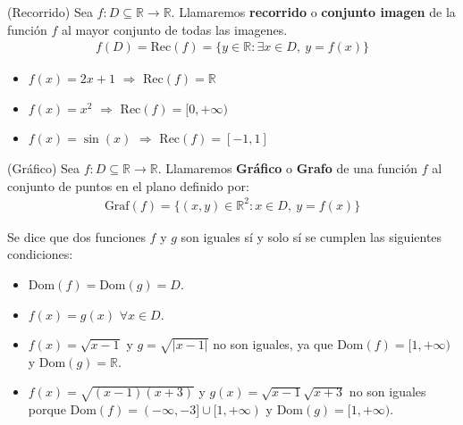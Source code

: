 \documentclass[12pt]{book}
\begin{document}
\begin{defi}{(Recorrido)}{}
Sea $f : D \subseteq \mathbb{R} \longrightarrow \mathbb{R}$.
    Llamaremos \textbf{recorrido} o \textbf{conjunto imagen} de la función $f$ al mayor conjunto de todas las imagenes. 
\begin{align*}
    f(D) =\text{Rec}(f)=\{ y \in \mathbb{R} : \exists x \in D, \ y=f(x) \}
\end{align*}
\end{defi}

\begin{eje}{}{}
    \begin{itemize}
        \item  $f(x)=2x+1$ $\Longrightarrow$ $\text{Rec}(f)=\mathbb{R}$

        \item $f(x)=x^2$ $\Longrightarrow$ $\text{Rec}(f)=[0, +\infty)$

        \item $f(x)= \sin(x)$ $\Longrightarrow$ $\text{Rec}(f)=[-1,1]$
    \end{itemize}
\end{eje}

\begin{defi}{(Gráfico)}{}
Sea $f : D \subseteq \mathbb{R} \longrightarrow \mathbb{R}$.
Llamaremos \textbf{Gráfico} o \textbf{Grafo} de una función $f$ al conjunto de puntos en el plano definido por:
\begin{align*}
    \text{Graf}(f)=\{(x,y) \in \mathbb{R}^2 : x \in D, \ y=f(x) \}
\end{align*}
\end{defi}

\begin{defi}{}{}
    Se dice que dos funciones $f$ y $g$ son iguales sí y solo sí se cumplen las siguientes condiciones:
\begin{itemize}
    \item $\text{Dom}(f)=\text{Dom}(g)=D$.
    \item $f(x)=g(x)$ $\forall x \in D$.
\end{itemize}
\end{defi}

\begin{eje}{}{}
    \begin{itemize}
        \item $f(x)= \sqrt{x-1}$ y $g=\sqrt{|x-1|}$ no son iguales, ya que  $\text{Dom}(f)=[1, + \infty)$ y $\text{Dom}(g)=\mathbb{R}$.

        \item $f(x)=\sqrt{(x-1)(x+3)}$ y $g(x)= \sqrt{x-1}\sqrt{x+3}$ no son iguales porque  $\text{Dom}(f)=(-\infty, -3] \cup [1, + \infty)$ y $\text{Dom}(g)=[1,+ \infty)$.
    \end{itemize}
\end{eje}
\end{document}
